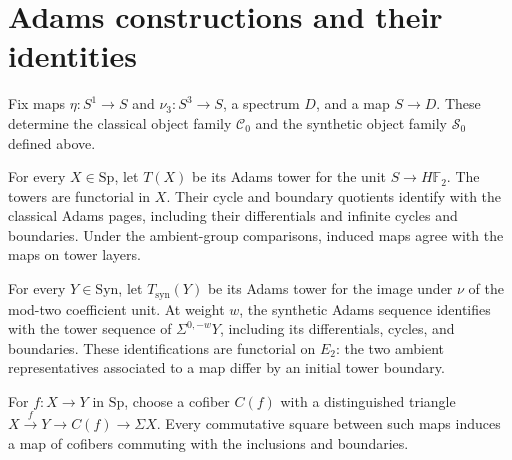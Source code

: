 \section{Adams constructions and their identities}

\begin{definition}
\label{frontier:AdamsSynthetic:0895d4999173}
Fix maps $\eta\colon S^1\to S$ and $\nu_3\colon S^3\to S$, a spectrum $D$, and a map $S\to D$. These determine the classical object family $\mathcal C_0$ and the synthetic object family $\mathcal S_0$ defined above.
\end{definition}

\begin{definition}
\label{frontier:AdamsSynthetic:14d5e6606bc5}
For every $X\in\mathrm{Sp}$, let $T(X)$ be its Adams tower for the unit $S\to H\mathbb F_2$. The towers are functorial in $X$. Their cycle and boundary quotients identify with the classical Adams pages, including their differentials and infinite cycles and boundaries. Under the ambient-group comparisons, induced maps agree with the maps on tower layers.
\end{definition}

\begin{definition}
\label{frontier:AdamsSynthetic:1b85f123880c}
For every $Y\in\mathrm{Syn}$, let $T_{\mathrm{syn}}(Y)$ be its Adams tower for the image under $\nu$ of the mod-two coefficient unit. At weight $w$, the synthetic Adams sequence identifies with the tower sequence of $\Sigma^{0,-w}Y$, including its differentials, cycles, and boundaries. These identifications are functorial on $E_2$: the two ambient representatives associated to a map differ by an initial tower boundary.
\end{definition}

\begin{definition}
\label{frontier:AdamsSynthetic:23334467e67d}
For $f\colon X\to Y$ in $\mathrm{Sp}$, choose a cofiber $C(f)$ with a distinguished triangle $X\xrightarrow f Y\to C(f)\to\Sigma X$. Every commutative square between such maps induces a map of cofibers commuting with the inclusions and boundaries.
\end{definition}

